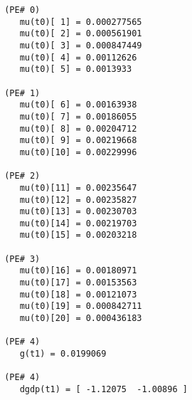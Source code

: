 \begin{verbatim}
 (PE# 0)
    mu(t0)[ 1] = 0.000277565
    mu(t0)[ 2] = 0.000561901
    mu(t0)[ 3] = 0.000847449
    mu(t0)[ 4] = 0.00112626
    mu(t0)[ 5] = 0.0013933

 (PE# 1)
    mu(t0)[ 6] = 0.00163938
    mu(t0)[ 7] = 0.00186055
    mu(t0)[ 8] = 0.00204712
    mu(t0)[ 9] = 0.00219668
    mu(t0)[10] = 0.00229996

 (PE# 2)
    mu(t0)[11] = 0.00235647
    mu(t0)[12] = 0.00235827
    mu(t0)[13] = 0.00230703
    mu(t0)[14] = 0.00219703
    mu(t0)[15] = 0.00203218

 (PE# 3)
    mu(t0)[16] = 0.00180971
    mu(t0)[17] = 0.00153563
    mu(t0)[18] = 0.00121073
    mu(t0)[19] = 0.000842711
    mu(t0)[20] = 0.000436183

 (PE# 4)
    g(t1) = 0.0199069

 (PE# 4)
    dgdp(t1) = [ -1.12075  -1.00896 ]
\end{verbatim}